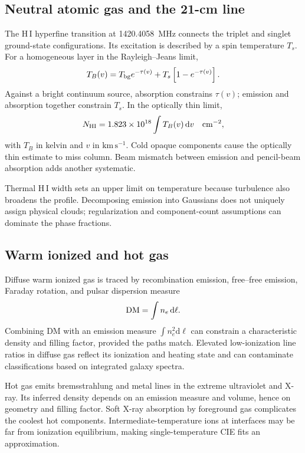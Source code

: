 \subsection{Neutral atomic gas and the 21-cm line}

The H\,I hyperfine transition at 1420.4058~MHz connects the triplet and singlet
ground-state configurations.  Its excitation is described by a spin temperature
$T_s$.  For a homogeneous layer in the Rayleigh--Jeans limit,
\begin{equation}
 T_B(v)=T_{\rm bg}e^{-\tau(v)}+T_s\left[1-e^{-\tau(v)}\right].
 \label{eq:hi-transfer}
\end{equation}
Against a bright continuum source, absorption constrains $\tau(v)$; emission and
absorption together constrain $T_s$.  In the optically thin limit,
\begin{equation}
 N_{\rm HI}=1.823\times10^{18}
 \int T_B(v)\,\mathrm{d}v
 \quad\mathrm{cm^{-2}},
 \label{eq:hi-thin-column}
\end{equation}
with $T_B$ in kelvin and $v$ in $\mathrm{km\,s^{-1}}$.  Cold opaque components cause
the optically thin estimate to miss column.  Beam mismatch between emission and
pencil-beam absorption adds another systematic.

Thermal H\,I width sets an upper limit on temperature because turbulence also
broadens the profile.  Decomposing emission into Gaussians does not uniquely assign
physical clouds; regularization and component-count assumptions can dominate the
phase fractions.

\subsection{Warm ionized and hot gas}

Diffuse warm ionized gas is traced by recombination emission, free--free emission,
Faraday rotation, and pulsar dispersion measure
\begin{equation}
 {\rm DM}=\int n_e\,\mathrm{d}\ell.
 \label{eq:dispersion-measure}
\end{equation}
Combining DM with an emission measure $\int n_e^2\mathrm{d}\ell$ can constrain a
characteristic density and filling factor, provided the paths match.  Elevated
low-ionization line ratios in diffuse gas reflect its ionization and heating state and
can contaminate classifications based on integrated galaxy spectra.

Hot gas emits bremsstrahlung and metal lines in the extreme ultraviolet and X-ray.
Its inferred density depends on an emission measure and volume, hence on geometry and
filling factor.  Soft X-ray absorption by foreground gas complicates the coolest hot
components.  Intermediate-temperature ions at interfaces may be far from ionization
equilibrium, making single-temperature CIE fits an approximation.

